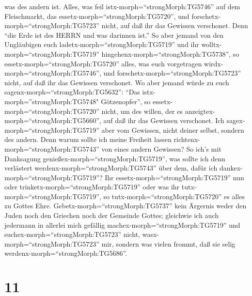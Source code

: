 was des andern ist.  Alles, was feil
istx-morph=``strongMorph:TG5746'' auf dem Fleischmarkt, das
essetx-morph=``strongMorph:TG5720'', und
forschetx-morph=``strongMorph:TG5723'' nicht, auf daß ihr das Gewissen
verschonet.  Denn ``die Erde ist des HERRN und was darinnen
ist.''  So aber jemand von den Ungläubigen euch
ladetx-morph=``strongMorph:TG5719'' und ihr
wolltx-morph=``strongMorph:TG5719''
hingehenx-morph=``strongMorph:TG5738'', so
essetx-morph=``strongMorph:TG5720'' alles, was euch vorgetragen
wirdx-morph=``strongMorph:TG5746'', und
forschetx-morph=``strongMorph:TG5723'' nicht, auf daß ihr das Gewissen
verschonet.  Wo aber jemand würde zu euch
sagenx-morph=``strongMorph:TG5632'': ``Das
istx-morph=''strongMorph:TG5748" Götzenopfer'', so
essetx-morph=``strongMorph:TG5720'' nicht, um des willen, der es
anzeigtex-morph=``strongMorph:TG5660'', auf daß ihr das Gewissen
verschonet.  Ich sagex-morph=``strongMorph:TG5719'' aber
vom Gewissen, nicht deiner selbst, sondern des andern. Denn warum sollte
ich meine Freiheit lassen richtenx-morph=``strongMorph:TG5743'' von
eines andern Gewissen?  So ich's mit Danksagung
genießex-morph=``strongMorph:TG5719'', was sollte ich denn verlästert
werdenx-morph=``strongMorph:TG5743'' über dem, dafür ich
dankex-morph=``strongMorph:TG5719''?  Ihr
essetx-morph=``strongMorph:TG5719'' nun oder
trinketx-morph=``strongMorph:TG5719'' oder was ihr
tutx-morph=``strongMorph:TG5719'', so tutx-morph=``strongMorph:TG5720''
es alles zu Gottes Ehre. 
Gebetx-morph=``strongMorph:TG5737'' kein Ärgernis weder den Juden noch
den Griechen noch der Gemeinde Gottes;  gleichwie ich auch
jedermann in allerlei mich gefällig machex-morph=``strongMorph:TG5719''
und suchex-morph=``strongMorph:TG5723'' nicht,
wasx-morph=``strongMorph:TG5723'' mir, sondern was vielen frommt, daß
sie selig werdenx-morph=``strongMorph:TG5686''.

\hypertarget{section-10}{%
\section{11}\label{section-10}}

